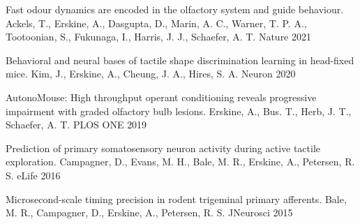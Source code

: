 
\begin{cvhonors}

  \cvhonor
    {Fast odour dynamics are encoded in the olfactory system and guide behaviour.} %
    {Ackels, T., Erskine, A., Dasgupta, D., Marin, A. C., Warner, T. P. A., Tootoonian, S., Fukunaga, I., Harris, J. J., Schaefer, A. T.} %
    {Nature} %
    {2021} %

  \cvhonor
    {Behavioral and neural bases of tactile shape discrimination learning in head-fixed mice.} %
    {Kim, J., Erskine, A., Cheung, J. A., Hires, S. A.} %
    {Neuron} %
    {2020} %

    \cvhonor
      {AutonoMouse: High throughput operant conditioning reveals progressive impairment with graded olfactory bulb lesions.} %
      {Erskine, A., Bus. T., Herb, J. T., Schaefer, A. T.} %
      {PLOS ONE} %
      {2019} %

  \cvhonor
    {Prediction of primary somatosensory neuron activity during active tactile exploration.} %
    {Campagner, D., Evans, M. H., Bale, M. R., Erskine, A., Petersen, R. S.} %
    {eLife} %
    {2016} %

  \cvhonor
    {Microsecond-scale timing precision in rodent trigeminal primary afferents.} %
    {Bale, M. R., Campagner, D., Erskine, A., Petersen, R. S.} %
    {JNeurosci} %
    {2015} %

\end{cvhonors}